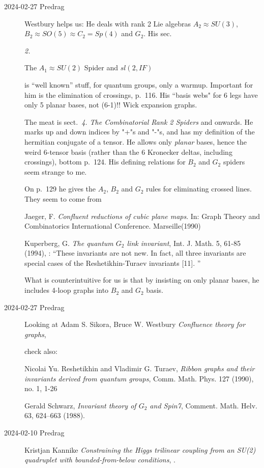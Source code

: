 \begin{description}
\item[2024-02-27 Predrag] Westbury helps us:
He deals with rank 2 {Lie} algebras $A_2\approx{SU(3)}$,
$B_2\approx{SO(5)}\approx{C_2=Sp(4)}$ and $G_2$.
His sec.~{\em 2.

The  $A_1\approx{SU(2)}$ Spider and $sl(2, IF)$}
is ``well known'' stuff, for quantum groups, only a warmup.
Important for him is the elimination of crossings, p.~116.
His ``basis webs" for 6 legs have only 5 planar bases, not (6-1)!!
Wick expansion graphs.


The meat is
sect.~{\em 4. The Combinatorial Rank 2 Spiders} and onwards. He marks
up and down indices by "+"s and "-"s, and has my definition
of the hermitian conjugate of a tensor. He allows only {\em planar} bases,
hence the weird 6-tensor basis (rather than the 6 Kronecker deltas,
including crossings), bottom p.~124.
His defining relations for $B_2$ and $G_2$ spiders seem strange to me.

On p.~129 he gives the $A_2$,  $B_2$ and $G_2$ rules for eliminating crossed lines.
They seem to come from

Jaeger, F. {\em Confluent reductions of cubic plane maps}. In: Graph Theory and Combinatorics
International Conference. Marseille(1990)

Kuperberg, G. {\em The quantum $G_2$ link invariant}, Int. J. Math. 5, 61-85 (1994),
:
``These invariants are not new. In fact, all three invariants are special
cases of the Reshetikhin-Turaev invariants [11]. ''

What is counterintuitive for us is that by insisting on only planar bases, he includes
4-loop graphs into  $B_2$ and $G_2$ basis.

\item[2024-02-27 Predrag]
Looking at
Adam S. Sikora, Bruce W. Westbury
{\em Confluence theory for graphs}, 

check also:

Nicolai Yu. Reshetikhin and Vladimir G. Turaev,
{\em Ribbon graphs and their invariants derived from
quantum groups}, Comm. Math. Phys. 127 (1990), no. 1, 1-26

Gerald Schwarz,
{\em Invariant theory of $G_2$ and Spin7},
Comment. Math. Helv. 63, 624--663  (1988).

\item[2024-02-10 Predrag]
Kristjan Kannike
{\em Constraining the Higgs trilinear coupling from an SU(2) quadruplet
with bounded-from-below conditions},
.


\end{description}
